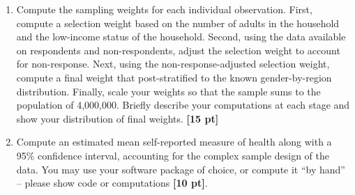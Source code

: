 \documentclass[12pt]{article}
\begin{document}
\begin{enumerate}
\begin{enumerate}[itemsep=5ex]
\item Compute the sampling weights for each individual observation. First, compute a selection weight based on the number of adults in the household and the low-income status of the household. Second, using the data available on respondents and non-respondents, adjust the selection weight to account for non-response. Next, using the non-response-adjusted selection weight, compute a final weight that post-stratified to the known gender-by-region distribution. Finally, scale your weights so that the sample sums to the population of 4,000,000. Briefly describe your computations at each stage and show your distribution of final weights. {\bf [15 pt]}

\item Compute an estimated mean self-reported measure of health along with a 95\% confidence interval, accounting for the complex sample design of the data. You may use your software package of choice, or compute it “by hand” – please show code or computations {\bf [10 pt]}.
\end{enumerate}

\end{enumerate}
\end{document}
